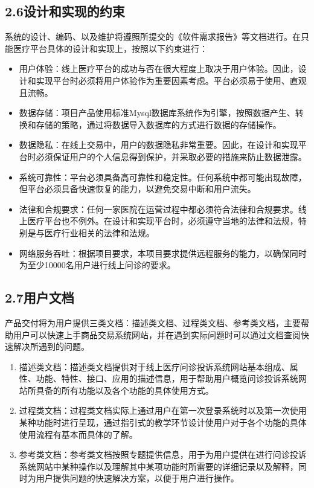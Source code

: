 \documentclass[24pt,a4paper]{article}%
\begin{document}
\subsection*{\songti 2.6设计和实现的约束}
系统的设计、编码、以及维护将遵照所提交的《软件需求报告》等文档进行。在只能医疗平台具体的设计和实现上，按照以下约束进行：
\begin{itemize}
	\item 用户体验：线上医疗平台的成功与否在很大程度上取决于用户体验。因此，设计和实现平台时必须将用户体验作为重要因素考虑。平台必须易于使用、直观且流畅。
	\item 数据存储：项目产品使用标准Mysql数据库系统作为引擎，按照数据产生、转换和存储的策略，通过将数据导入数据库的方式进行数据的存储操作。
	\item 数据隐私：在线上交易中，用户的数据隐私非常重要。因此，在设计和实现平台时必须保证用户的个人信息得到保护，并采取必要的措施来防止数据泄露。
	\item 系统可靠性：平台必须具备高可靠性和稳定性。任何系统中都可能出现故障，但平台必须具备快速恢复的能力，以避免交易中断和用户流失。
	\item 法律和合规要求：任何一家医院在运营过程中都必须符合法律和合规要求。线上医疗平台也不例外。在设计和实现平台时，必须遵守当地的法律和法规，特别是与医疗行业相关的法律和法规。
	\item 网络服务吞吐：根据项目要求，本项目要求提供远程服务的能力，以确保同时为至少10000名用户进行线上问诊的要求。
\end{itemize}

\subsection*{\songti 2.7用户文档}
产品交付将为用户提供三类文档：描述类文档、过程类文档、参考类文档，主要帮助用户可以快速上手商品交易系统网站，并在遇到实际问题时可以通过文档查阅快速解决所遇到的问题。
\begin{enumerate}
	\item 描述类文档：描述类文档提供对于线上医疗问诊投诉系统网站基本组成、属性、功能、特性、接口、应用的描述信息，用于帮助用户概览问诊投诉系统网站所具备的所有功能以及各个功能的具体使用方式。
	\item 过程类文档：过程类文档实际上通过用户在第一次登录系统时以及第一次使用某种功能时进行呈现，通过指引式的教学环节设计使用户对于各个功能的具体使用流程有基本而具体的了解。
	\item 参考类文档：参考类文档按照专题提供信息，用于为用户提供在进行问诊投诉系统网站中某种操作以及理解其中某项功能时所需要的详细记录以及解释，同时为用户提供问题的快速解决方案，以便于用户进行操作。
\end{enumerate}
\end{document}

